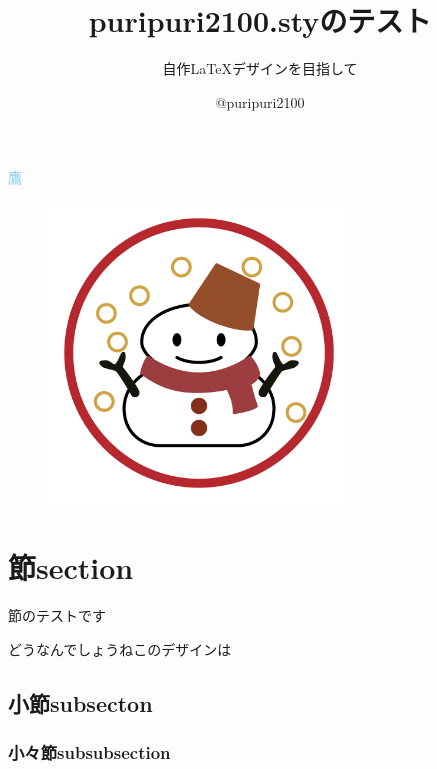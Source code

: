 \documentclass[]{ltjsarticle}
\begin{document}
\title{\textsf{puripuri2100.sty}のテスト}
\subtitle{自作\LaTeX デザインを目指して}
\author{@puripuri2100}
\date{\puritoday}
\purimaketitle



\tableofcontents

\textcolor{SkyBlue}{鷹}
\begin{figure}[h]
\centering
\includegraphics[width=80mm]{aki.jpg}
\end{figure}


\section{節section}
節のテストです

どうなんでしょうねこのデザインは
\subsection{小節subsecton}
\subsubsection{小々節subsubsection}
\end{document}
